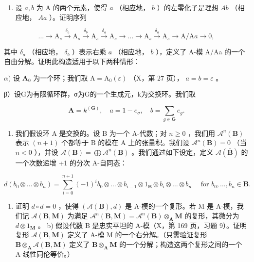 
\begin{enumerate}
\def\labelenumi{\arabic{enumi})}
\tightlist
\item
  设 \(a, b\) 为 A 的两个元素，使得 \(a\) （相应地， \(b\) ）的左零化子是理想 \(Ab\) （相应地， \(Aa\) ）。证明序列
\end{enumerate}

\[
\dots \longrightarrow \mathrm{A} _ {s} \xrightarrow {\delta_ {a}} \mathrm{A} _ {s} \xrightarrow {\delta_ {b}} \mathrm{A} _ {s} \xrightarrow {\delta_ {a}} \mathrm{A} _ {s} \longrightarrow \dots \longrightarrow \mathrm{A} _ {s} \xrightarrow {\delta_ {a}} \mathrm{A} _ {s} \longrightarrow \mathrm{A} / \mathrm{A} a \longrightarrow 0,
\]

其中 \(\delta_{a}\) （相应地， \(\delta_{b}\) ）表示右乘 \(a\) （相应地， \(b\) ），定义了 A-模 A/Aa 的一个自由分解。证明此构造适用于以下两种情形：

\(\alpha)\) 设 \(\mathbf{A}_0\) 为一个环；我们取 \(\mathrm{A} = \mathrm{A}_0(\varepsilon)\) （X，第 27 页）， \(a = b = \varepsilon\) 。

β）设G为有限循环群，σ为G的一个生成元，k为交换环。我们取

\[
\mathbf {A} = k ^ {(\mathbf {G})}, \quad a = 1 - e _ {\sigma}, \quad b = \sum_ {g \in \mathbf {G}} e _ {g}.
\]

\begin{enumerate}
\def\labelenumi{\arabic{enumi})}
\setcounter{enumi}{1}
\tightlist
\item
  我们假设环 A 是交换的。设 B 为一个 A-代数；对 \(n \geqslant 0\) ，我们用 \(\mathcal{A}^{n}(\mathbf{B})\) 表示 \((n + 1)\) 个都等于 B 的模在 A 上的张量积。我们设 \(\mathcal{A}^{n}(\mathbf{B}) = 0\) （当 \(n < 0\) ），并设 \(\mathcal{A}(\mathbf{B}) = \bigoplus \mathcal{A}^{n}(\mathbf{B})\) 。我们通过如下设定，定义 \(\mathcal{A}(\bar{\mathbf{B}})\) 的一个次数递增 +1 的分次 A-自同态：
\end{enumerate}

\[
d (b _ {0} \otimes \dots \otimes b _ {n}) = \sum_ {i = 0} ^ {n + 1} (- 1) ^ {i} b _ {0} \otimes \dots \otimes b _ {i - 1} \otimes 1 _ {\mathbf {B}} \otimes b _ {i} \otimes \dots \otimes b _ {n} \quad \text { for } b _ {0}, \dots , b _ {n} \in \mathbf {B}.
\]

\begin{enumerate}
\def\labelenumi{\alph{enumi})}
\tightlist
\item
  证明 \(d \circ d = 0\) ，使得 \((\mathcal{A}(\mathbf{B}), d)\) 是 A-模的一个复形。若 M 是 A-模，我们记 \(\mathcal{A}(\mathbf{B}, \mathbf{M})\) 为满足 \(\mathcal{A}^{n}(\mathbf{B}, \mathbf{M}) = \mathcal{A}^{n}(\mathbf{B}) \otimes_{\mathbf{A}} \mathbf{M}\) 的复形，其微分为 \(d \otimes 1_{\mathbf{M}}\) 。 b) 假设代数 B 是忠实平坦的 A-模（X，第 169 页，习题 9）。证明复形 \(\mathcal{A}(\mathbf{B}, \mathbf{M})\) 定义了 A-模 M 的一个右分解。（只需验证复形 \(\mathbf{B} \otimes_{\mathbf{A}} \mathcal{A}(\mathbf{B}, \mathbf{M})\) 定义了 \(\mathbf{B} \otimes_{\mathbf{A}} \mathbf{M}\) 的一个分解；构造这两个复形之间的一个 A-线性同伦等价。）
\end{enumerate}

